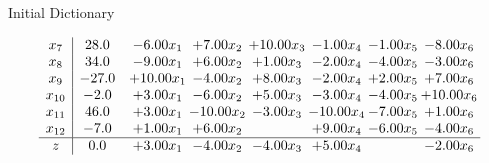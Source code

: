 \documentclass[8pt]{article}
\begin{document}
Initial Dictionary 

\[\begin{array}{c| c c@{\hskip 2pt} c@{\hskip 2pt} c@{\hskip 2pt} c@{\hskip 2pt} c@{\hskip 2pt} c@{\hskip 2pt} }
 x_{7}   &  28.0 & -6.00 x_{1} & +  7.00 x_{2} & + 10.00 x_{3} & -1.00 x_{4} & -1.00 x_{5} & -8.00 x_{6}\\
 x_{8}   &  34.0 & -9.00 x_{1} & +  6.00 x_{2} & +  1.00 x_{3} & -2.00 x_{4} & -4.00 x_{5} & -3.00 x_{6}\\
 x_{9}   &  -27.0 & + 10.00 x_{1} & -4.00 x_{2} & +  8.00 x_{3} & -2.00 x_{4} & +  2.00 x_{5} & +  7.00 x_{6}\\
 x_{10}   &  -2.0 & +  3.00 x_{1} & -6.00 x_{2} & +  5.00 x_{3} & -3.00 x_{4} & -4.00 x_{5} & + 10.00 x_{6}\\
 x_{11}   &  46.0 & +  3.00 x_{1} & -10.00 x_{2} & -3.00 x_{3} & -10.00 x_{4} & -7.00 x_{5} & +  1.00 x_{6}\\
 x_{12}   &  -7.0 & +  1.00 x_{1} & +  6.00 x_{2} &   & +  9.00 x_{4} & -6.00 x_{5} & -4.00 x_{6}\\
\hline
z    &  0.0 & +  3.00 x_{1} & -4.00 x_{2} & -4.00 x_{3} & +  5.00 x_{4} &   & -2.00 x_{6}\\
\end{array}\]
\end{document}
